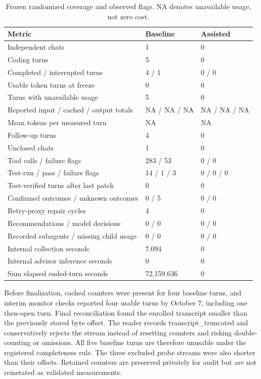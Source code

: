 \documentclass[11pt]{article}
\begin{document}
\begin{table}[htbp]
\centering
\small
\caption{Frozen randomized coverage and observed flags. NA denotes unavailable usage, not zero cost.}
\begin{tabularx}{\linewidth}{@{}XXX@{}}
\toprule
Metric & Baseline & Assisted\\
\midrule
Independent chats & 1 & 0\\
Coding turns & 5 & 0\\
Completed / interrupted turns & 4 / 1 & 0 / 0\\
Usable token turns at freeze & 0 & 0\\
Turns with unavailable usage & 5 & 0\\
Reported input / cached / output totals & NA / NA / NA & NA / NA / NA\\
Mean tokens per measured turn & NA & NA\\
Follow-up turns & 4 & 0\\
Unclosed chats & 1 & 0\\
Tool calls / failure flags & 283 / 53 & 0 / 0\\
Test-run / pass / failure flags & 14 / 1 / 3 & 0 / 0 / 0\\
Test-verified turns after last patch & 0 & 0\\
Confirmed outcomes / unknown outcomes & 0 / 5 & 0 / 0\\
Retry-proxy repair cycles & 4 & 0\\
Recommendations / model decisions & 0 / 0 & 0 / 0\\
Recorded subagents / missing child usage & 0 / 0 & 0 / 0\\
Internal collection seconds & 7.094 & 0\\
Internal advisor inference seconds & 0 & 0\\
Sum elapsed ended-turn seconds & 72,159.636 & 0\\
\bottomrule
\end{tabularx}
\end{table}
Before finalization, cached counters were present for four baseline turns, and interim monitor checks reported four usable turns by October 7, including one then-open turn. Final reconciliation found the enrolled transcript smaller than the previously stored byte offset. The reader records transcript\_truncated and conservatively rejects the stream instead of resetting counters and risking double-counting or omissions. All five baseline turns are therefore unusable under the registered completeness rule. The three excluded probe streams were also shorter than their offsets. Retained counters are preserved privately for audit but are not reinstated as validated measurements.
\end{document}

